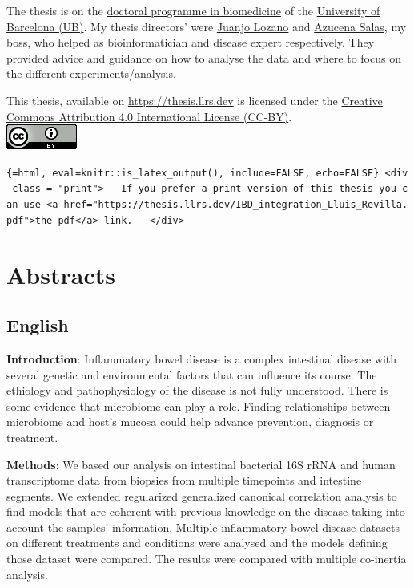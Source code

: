\documentclass[
  12pt,
  a4paper,
  twoside,
  openright]{book}
\begin{document}
The thesis is on the \href{http://www.ub.edu/doctorat_biomedicina/eng/index.htm}{doctoral programme in biomedicine} of the \href{https://www.ub.edu/web/portal/en/}{University of Barcelona (UB)}.
My thesis directors' were \href{https://orcid.org/0000-0001-7613-3908}{Juanjo Lozano} and \href{https://orcid.org/0000-0003-4572-2907}{Azucena Salas}, my boss, who helped as bioinformatician and disease expert respectively.
They provided advice and guidance on how to analyse the data and where to focus on the different experiments/analysis.

This thesis, available on \url{https://thesis.llrs.dev} is licensed under the \href{https://creativecommons.org/licenses/by/4.0/}{Creative Commons Attribution 4.0 International License (CC-BY)}.\\
\includegraphics{images/by.png}

\texttt{\{=html,\ eval=knitr::is\_latex\_output(),\ include=FALSE,\ echo=FALSE\}\ \textless{}div\ class\ =\ "print"\textgreater{}\ \ \ If\ you\ prefer\ a\ print\ version\ of\ this\ thesis\ you\ can\ use\ \textless{}a\ href="https://thesis.llrs.dev/IBD\_integration\_Lluis\_Revilla.pdf"\textgreater{}the\ pdf\textless{}/a\textgreater{}\ link.\ \ \ \textless{}/div\textgreater{}}

\hypertarget{abstracts}{%
\chapter*{Abstracts}\label{abstracts}}

\hypertarget{english}{%
\section*{English}\label{english}}

\textbf{Introduction}: Inflammatory bowel disease is a complex intestinal disease with several genetic and environmental factors that can influence its course.
The ethiology and pathophysiology of the disease is not fully understood.
There is some evidence that microbiome can play a role.
Finding relationships between microbiome and host's mucosa could help advance prevention, diagnosis or treatment.

\textbf{Methods}: We based our analysis on intestinal bacterial 16S rRNA and human transcriptome data from biopsies from multiple timepoints and intestine segments.
We extended regularized generalized canonical correlation analysis to find models that are coherent with previous knowledge on the disease taking into account the samples' information.
Multiple inflammatory bowel disease datasets on different treatments and conditions were analysed and the models defining those dataset were compared.
The results were compared with multiple co-inertia analysis.
\end{document}
